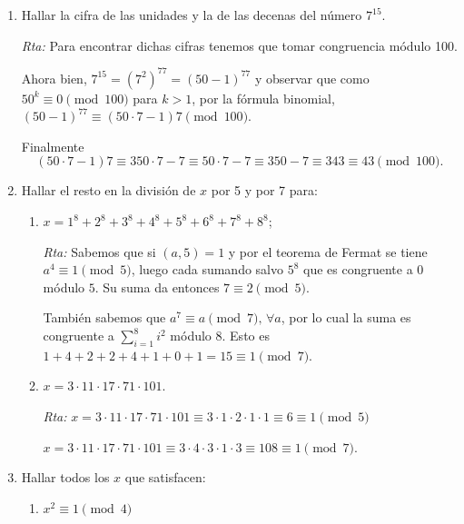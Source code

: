 \documentclass[a4paper,12pt,twoside,spanish,reqno]{amsbook}
\numberwithin{equation}{section}
\newcommand{\rta}{\noindent\textit{Rta: }}
\begin{document}
\begin{enumerate}
    
    
    \item Hallar la cifra de las unidades y la de las decenas del número $7^{15}$.
        
    \rta Para encontrar dichas cifras tenemos que tomar congruencia módulo 100.

    Ahora bien,    $7^{15}=(7^2)^77=(50-1)^77$ y observar que como  $50^k\equiv 0 \pmod{100}$ para $k>1$, por la fórmula binomial,  $(50-1)^77 \equiv(50\cdot7-1)7 \pmod{100}$. 
    
    Finalmente 
    $$(50\cdot 7-1)7\equiv 350\cdot 7- 7\equiv 50\cdot 7- 7\equiv 350 -7 \equiv 343 \equiv 43\pmod{100}.$$
    
    
    
    \item Hallar el resto en la división de $x$ por 5 y por 7 para:
    \begin{enumerate}
        \item $x=1^8 + 2^8 + 3^8 + 4^8 + 5^8 + 6^8 + 7^8 + 8^8$;
            
        \rta Sabemos que si $(a,5)=1$ y por el teorema de Fermat se tiene $a^4\equiv 1 \pmod{5}$, luego cada sumando salvo $5^8$ que es congruente a $0$ módulo $5$. Su suma da entonces $7\equiv 2 \pmod{5}$.
        
        También sabemos que $a^7\equiv a \pmod{7},\, \forall a$, por lo cual la suma es congruente a $\sum_{i=1}^8i^2$ módulo 8.
        Esto es $1+4+2+2+4+1+0+1=15\equiv 1 \pmod{7}$.
        
        \item $x=3\cdot 11\cdot 17\cdot 71\cdot 101$.
            
        \rta $ x = 3 \cdot11\cdot17 \cdot 71 \cdot101\equiv 3 \cdot1 \cdot2 \cdot1 \cdot1\equiv 6\equiv 1 \pmod{5}$
        
        $ x = 3\cdot11\cdot17 \cdot 71 \cdot101\equiv 3\cdot4\cdot3\cdot1\cdot3\equiv 108\equiv 1 \pmod{7}$.
        
        
    \end{enumerate}
    
    

    
    
    \item Hallar todos los $x$ que satisfacen:
    \begin{enumerate}
        \item $x^2 \equiv1 \pmod{4}$\quad
        

\end{enumerate}
\end{enumerate}
\end{document}

